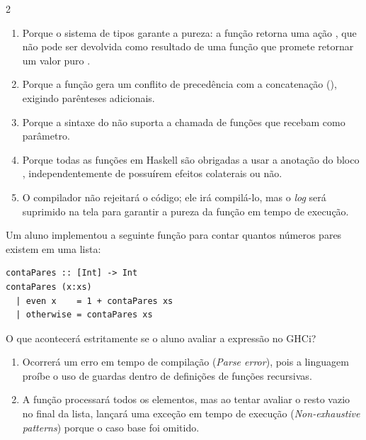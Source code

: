 \documentclass[a4paper,10pt,brazil]{article}
\begin{document}
\begin{multicols}{2}
\begin{enumerate}
  \item Porque o sistema de tipos garante a pureza: a função  retorna uma ação , que não pode ser devolvida como resultado de uma função que promete retornar um valor puro .

  \item Porque a função  gera um conflito de precedência com a concatenação (\haskellinline{++}), exigindo parênteses adicionais.

  \item Porque a sintaxe do  não suporta a chamada de funções que recebam  como parâmetro.

  \item Porque todas as funções em Haskell são obrigadas a usar a anotação do bloco , independentemente de possuírem efeitos colaterais ou não.

  \item O compilador não rejeitará o código; ele irá compilá-lo, mas o \emph{log} será suprimido na tela para garantir a pureza da função em tempo de execução.


\end{enumerate}

Um aluno implementou a seguinte função para contar quantos números pares existem em uma lista:

\begin{verbatim}
contaPares :: [Int] -> Int
contaPares (x:xs)
  | even x    = 1 + contaPares xs
  | otherwise = contaPares xs
\end{verbatim}

O que acontecerá estritamente se o aluno avaliar a expressão  no GHCi?

\begin{enumerate}
  \item Ocorrerá um erro em tempo de compilação (\emph{Parse error}), pois a linguagem proíbe o uso de guardas dentro de definições de funções recursivas.

  \item A função processará todos os elementos, mas ao tentar avaliar o resto vazio no final da lista, lançará uma exceção em tempo de execução (\emph{Non-exhaustive patterns}) porque o caso base  foi omitido.


\end{enumerate}
\end{multicols}
\end{document}
